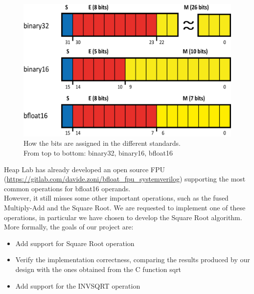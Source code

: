 \documentclass[12pt]{article}
\begin{document}
\begin{figure}[h]
\centering
\captionsetup{justification=centering}
\includegraphics{float.png}	
\caption{How the bits are assigned in the different standards. \\From top to bottom: binary32, binary16, bfloat16}
\end{figure}

Heap Lab has already developed an open source FPU (\url{https://gitlab.com/davide.zoni/bfloat_fpu_systemverilog}) supporting the most common operations for bfloat16 operands. \\
However, it still misses some other important operations, such as the fused Multiply-Add and the Square Root. We are requested to implement one of these operations, in particular we have chosen to develop the Square Root algorithm.
\\ More formally, the goals of our project are:
\begin{itemize}
\item Add support for Square Root operation
\item Verify the implementation correctness, comparing the results produced by our design with the ones obtained from the C function sqrt
\item Add support for the INVSQRT operation
\end{itemize}
\end{document}
